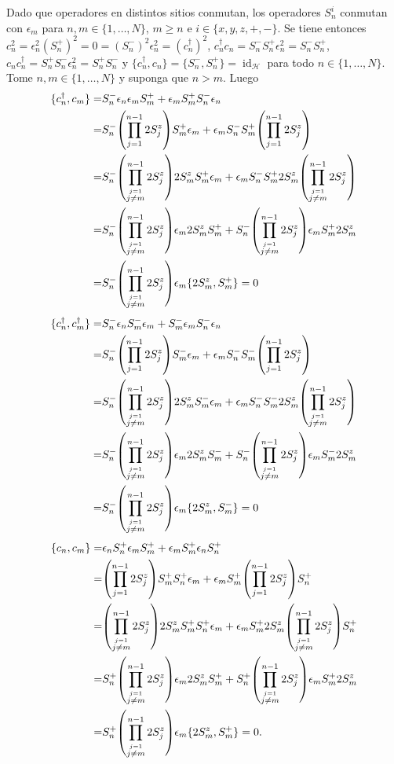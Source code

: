 \documentclass{article}
\DeclareMathOperator{\id}{id}
\begin{document}
Dado que operadores en distintos sitios conmutan, los operadores $S_n^i$ conmutan con $\epsilon_m$ para $n,m\in\{1,\dots,N\}$, $m\geq n$ e $i\in\{x,y,z,+,-\}$. Se tiene entonces $c_n^2=\epsilon_n^2(S_n^+)^2=0=(S_n^-)^2\epsilon_n^2=(c_n^\dagger)^2$, $c_n^\dagger c_n=S_n^-S_n^+\epsilon_n^2=S_n^-S_n^+$, $c_nc_n^\dagger =S_n^+S_n^-\epsilon_n^2=S_n^+S_n^-$ y $\{c_n^\dagger,c_n\}=\{S_n^-,S_n^+\}=\id_\mathcal{H}$ para todo $n\in\{1,\dots,N\}$. Tome $n,m\in\{1,\dots,N\}$ y suponga que $n>m$. Luego
\begin{align}
\begin{split}
\{c_n^\dagger ,c_m\}=&S_n^-\epsilon_n\epsilon_mS_m^++\epsilon_mS_m^+S_n^-\epsilon_n\\
=&S_n^-\qty(\prod_{j=1}^{n-1}2S^z_j)S_m^+\epsilon_m+\epsilon_mS_n^-S_m^+\qty(\prod_{j=1}^{n-1}2S^z_j)\\
=&S_n^-\qty(\prod_{\overset{j=1}{j\neq m}}^{n-1}2S^z_j)2S_m^zS_m^+\epsilon_m+\epsilon_mS_n^-S_m^+2S_m^z\qty(\prod_{\overset{j=1}{j\neq m}}^{n-1}2S^z_j)\\
=&S_n^-\qty(\prod_{\overset{j=1}{j\neq m}}^{n-1}2S^z_j)\epsilon_m2S_m^zS_m^++S_n^-\qty(\prod_{\overset{j=1}{j\neq m}}^{n-1}2S^z_j)\epsilon_mS_m^+2S_m^z\\
=&S_n^-\qty(\prod_{\overset{j=1}{j\neq m}}^{n-1}2S^z_j)\epsilon_m\{2S_m^z,S_m^+\}=0
\end{split}
\end{align}
\begin{align}
\begin{split}
\{c_n^\dagger ,c_m^\dagger\}=&S_n^-\epsilon_nS_m^-\epsilon_m+S_m^-\epsilon_mS_n^-\epsilon_n\\
=&S_n^-\qty(\prod_{j=1}^{n-1}2S^z_j)S_m^-\epsilon_m+\epsilon_mS_n^-S_m^-\qty(\prod_{j=1}^{n-1}2S^z_j)\\
=&S_n^-\qty(\prod_{\overset{j=1}{j\neq m}}^{n-1}2S^z_j)2S_m^zS_m^-\epsilon_m+\epsilon_mS_n^-S_m^-2S_m^z\qty(\prod_{\overset{j=1}{j\neq m}}^{n-1}2S^z_j)\\
=&S_n^-\qty(\prod_{\overset{j=1}{j\neq m}}^{n-1}2S^z_j)\epsilon_m2S_m^zS_m^-+S_n^-\qty(\prod_{\overset{j=1}{j\neq m}}^{n-1}2S^z_j)\epsilon_mS_m^-2S_m^z\\
=&S_n^-\qty(\prod_{\overset{j=1}{j\neq m}}^{n-1}2S^z_j)\epsilon_m\{2S_m^z,S_m^-\}=0
\end{split}
\end{align}
\begin{align}
\begin{split}
\{c_n,c_m\}=&\epsilon_nS_n^+\epsilon_mS_m^++\epsilon_mS_m^+\epsilon_nS_n^+\\
=&\qty(\prod_{j=1}^{n-1}2S^z_j)S_m^+S_n^+\epsilon_m+\epsilon_mS_m^+\qty(\prod_{j=1}^{n-1}2S^z_j)S_n^+\\
=&\qty(\prod_{\overset{j=1}{j\neq m}}^{n-1}2S^z_j)2S_m^zS_m^+S_n^+\epsilon_m+\epsilon_mS_m^+2S_m^z\qty(\prod_{\overset{j=1}{j\neq m}}^{n-1}2S^z_j)S_n^+\\
=&S_n^+\qty(\prod_{\overset{j=1}{j\neq m}}^{n-1}2S^z_j)\epsilon_m2S_m^zS_m^++S_n^+\qty(\prod_{\overset{j=1}{j\neq m}}^{n-1}2S^z_j)\epsilon_mS_m^+2S_m^z\\
=&S_n^+\qty(\prod_{\overset{j=1}{j\neq m}}^{n-1}2S^z_j)\epsilon_m\{2S_m^z,S_m^+\}=0.
\end{split}
\end{align}
\end{document}
